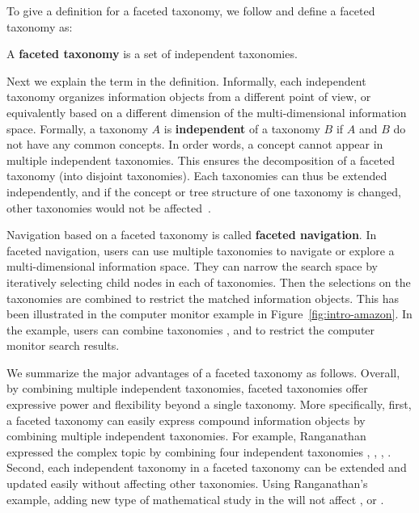 To give a definition for a faceted taxonomy, we follow \citet{tzitzikas2005compound} and define a faceted taxonomy as:
\begin{definition}
\label{def:ftaxonomy}
 A \textbf{faceted taxonomy} is a set of independent taxonomies.
\end{definition}
\noindent Next we explain the term  in the definition. Informally, each independent taxonomy organizes information objects from a different point of view, or equivalently based on a different dimension of the multi-dimensional information space. Formally, a taxonomy $A$ is \textbf{independent} of a taxonomy $B$ if $A$ and $B$ do not have any common concepts. In order words, a concept cannot appear in multiple independent taxonomies. This ensures the decomposition of a faceted taxonomy (into disjoint taxonomies). Each taxonomies can thus be extended independently, and if the concept or tree structure of one taxonomy is changed, other taxonomies would not be affected~\cite{wei2013survey}. 

Navigation based on a faceted taxonomy is called \textbf{faceted navigation}. In faceted navigation, users can use multiple taxonomies to navigate or explore a multi-dimensional information space. They can narrow the search space by iteratively selecting child nodes in each of taxonomies. Then the selections on the taxonomies are combined to restrict the matched information objects. This has been illustrated in the computer monitor example in Figure~\ref{fig:intro-amazon}. In the example, users can combine taxonomies ,  and  to restrict the computer monitor search results.


We summarize the major advantages of a faceted taxonomy as follows. Overall, by combining multiple independent taxonomies, faceted taxonomies offer expressive power and flexibility beyond a single taxonomy. More specifically, first, a faceted taxonomy can easily express compound information objects by combining multiple independent taxonomies.
For example, Ranganathan expressed the complex topic  by combining four independent taxonomies , , , . Second, each independent taxonomy in a faceted taxonomy can be extended and updated easily without affecting other taxonomies. Using Ranganathan's example, adding new type of mathematical study in the  will not affect ,  or .

